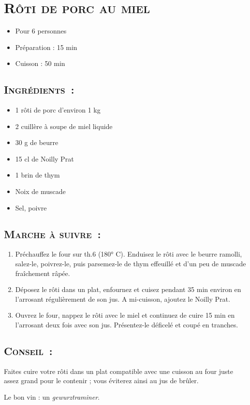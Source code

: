 \section[\normalsize{R\^oti de porc au miel}]{\LARGE{\textsc{R\^oti de porc au miel}}}


\begin{itemize}
\item Pour 6 personnes
\item Préparation : 15 min	
\item Cuisson : 50 min
\end{itemize}
\subsection*{\textsc{Ingrédients~:}}

\begin{itemize}
\item 1 rôti de porc d’environ 1 kg
\item 2 cuill\`ere \`a soupe de miel liquide
\item	30 g de beurre
\item	15 cl de Noilly Prat
\item 1 brin de thym
\item Noix de muscade
\item Sel, poivre
\end{itemize}


\subsection*{\textsc{Marche \`a suivre~:}}

\begin{enumerate}
\item Pr\'echauffez le four sur th.6 (180° C). Enduisez le r\^oti avec le beurre ramolli, salez-le, poivrez-le, puis parsemez-le de thym effeuill\'e et d’un peu de muscade fra\^ichement  r\^ap\'ee.

\item D\'eposez le r\^oti dans un plat, enfournez et cuisez pendant 35 min environ en l’arrosant régulièrement de son jus. A mi-cuisson, ajoutez le Noilly Prat.

\item Ouvrez le four, nappez le r\^oti avec le miel et continuez de cuire 15 min en l’arrosant deux fois avec son jus. Présentez-le d\'eficel\'e et coup\'e en tranches.
\end{enumerate}


\subsection*{\textsc{Conseil~:}}

Faites cuire votre r\^oti dans un plat compatible avec une cuisson au four juste assez grand pour le contenir ; vous \'eviterez ainsi au jus de br\^uler.

Le bon vin : un \emph{gewurztraminer}.
